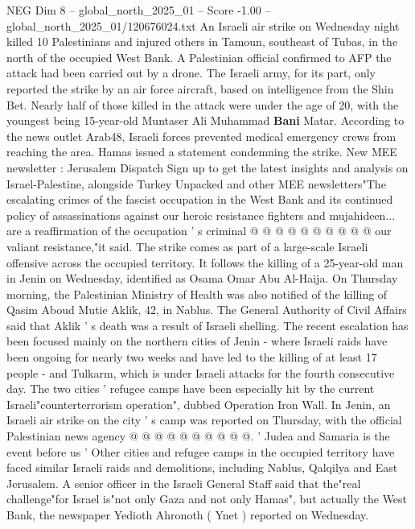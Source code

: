 \begin{textsample}{NEG Dim 8 – global\_north\_2025\_01 – Score -1.00 – global\_north\_2025\_01/120676024.txt}  \label{ex:f8_neg_168}
An Israeli air strike on Wednesday night killed 10 Palestinians and injured others in Tamoun, southeast of Tubas, in the north of the occupied West Bank.
A Palestinian official confirmed to AFP the attack had been carried out by a drone.
The Israeli army, for its part, only reported the strike by an air force aircraft, based on intelligence from the Shin Bet.
Nearly half of those killed in the attack were under the age of 20, with the youngest being 15-year-old Muntaser Ali Muhammad \textbf{Bani} Matar.
According to the news outlet Arab48, Israeli forces prevented medical emergency crews from reaching the area.
Hamas issued a statement condemning the strike.
New MEE newsletter : Jerusalem Dispatch Sign up to get the latest insights and analysis on Israel-Palestine, alongside Turkey Unpacked and other MEE newsletters"The escalating crimes of the fascist occupation in the West Bank and its continued policy of assassinations against our heroic resistance fighters and mujahideen... are a reaffirmation of the occupation ' s criminal @ @ @ @ @ @ @ @ @ @ our valiant resistance,"it said.
The strike comes as part of a large-scale Israeli offensive across the occupied territory.
It follows the killing of a 25-year-old man in Jenin on Wednesday, identified as Osama Omar Abu Al-Haija.
On Thursday morning, the Palestinian Ministry of Health was also notified of the killing of Qasim Aboud Mutie Aklik, 42, in Nablus.
The General Authority of Civil Affairs said that Aklik ' s death was a result of Israeli shelling.
The recent escalation has been focused mainly on the northern cities of Jenin - where Israeli raids have been ongoing for nearly two weeks and have led to the killing of at least 17 people - and Tulkarm, which is under Israeli attacks for the fourth consecutive day.
The two cities ' refugee camps have been especially hit by the current Israeli"counterterrorism operation", dubbed Operation Iron Wall.
In Jenin, an Israeli air strike on the city ' s camp was reported on Thursday, with the official Palestinian news agency @ @ @ @ @ @ @ @ @ @. ' Judea and Samaria is the event before us ' Other cities and refugee camps in the occupied territory have faced similar Israeli raids and demolitions, including Nablus, Qalqilya and East Jerusalem.
A senior officer in the Israeli General Staff said that the"real challenge"for Israel is"not only Gaza and not only Hamas", but actually the West Bank, the newspaper Yedioth Ahronoth ( Ynet ) reported on Wednesday.

\end{textsample}
